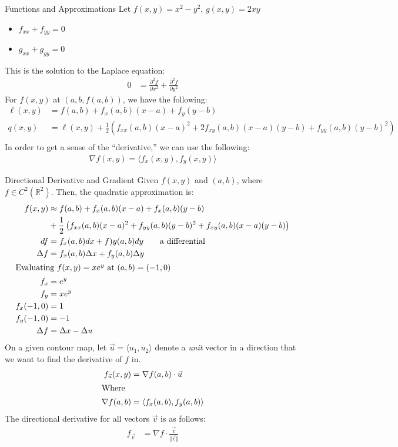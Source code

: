 \documentclass[8pt]{extarticle}
\begin{document}
  \begin{problem}{Functions and Approximations}
    Let $f(x,y) = x^2 - y^2$, $g(x,y) = 2xy$
    \begin{itemize}
      \item $f_{xx} + f_{yy} = 0$
      \item $g_{xx} + g_{yy} = 0$
    \end{itemize}
    This is the solution to the Laplace equation:
    \begin{align*}
      0 &= \frac{\partial^2 f}{\partial x^2} + \frac{\partial^2 f}{\partial y^2}
    \end{align*}
    For $f(x,y)$ at $(a,b,f(a,b))$, we have the following:
    \begin{align*}
      \ell(x,y) &= f(a,b) + f_x(a,b)(x-a) + f_y(y-b)\\
      q(x,y) &= \ell(x,y) + \frac{1}{2}\left(f_{xx}(a,b)(x-a)^2 + 2f_{xy}(a,b)(x-a)(y-b) + f_{yy}(a,b)(y-b)^2\right)\\
    \end{align*}
    In order to get a sense of the ``derivative,'' we can use the following:
    \begin{align*}
      \nabla f(x,y) = \langle f_x(x,y),f_y(x,y)\rangle
    \end{align*}
  \end{problem}
  \begin{problem}{Directional Derivative and Gradient}
    Given $f(x,y)$ and $(a,b)$, where $f\in C^{2}(\mathbb{R}^2)$. Then, the quadratic approximation is:
    \begin{align*}
      f(x,y) &\approx f(a,b) + f_{x}(a,b)(x-a) + f_x(a,b)(y-b)\\
             &+ \frac{1}{2}\left(f_{xx}(a,b)(x-a)^2 + f_{yy}(a,b)(y-b)^2 + f_{xy}(a,b)(x-a)(y-b)\right)\\
          df &= f_x(a,b)dx + f)y(a,b)dy \tag*{a differential}\\
      \Delta f &= f_x(a,b)\Delta x + f_y(a,b)\Delta y\\
      \shortintertext{Evaluating $f(x,y) = xe^y$ at $(a,b) = (-1,0)$}
      f_x &= e^y\\
      f_y &= xe^y\\
      f_x(-1,0) &= 1\\
      f_y(-1,0) &= -1\\
      \Delta f &= \Delta x - \Delta u
    \end{align*}
    On a given contour map, let $\vec u = \langle u_1,u_2\rangle$ denote a \textit{unit} vector in a direction that we want to find the derivative of $f$ in.
    \begin{align*}
      f_{\vec u}(x,y) &= \nabla f(a,b) \cdot \vec u\\
      \shortintertext{Where}
      \nabla f(a,b) &= \langle f_x(a,b),f_y(a,b)\rangle
    \end{align*}
    The directional derivative for all vectors $\vec v$ is as follows:
    \begin{align*}
      f_{\vec v} &= \nabla f \cdot \frac{\vec v}{\Vert \vec v \Vert}
    \end{align*}
  \end{problem}
\end{document}
